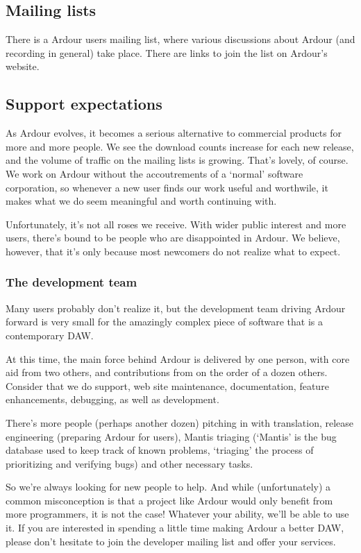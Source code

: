 \documentclass[10pt,a4paper]{book}
\begin{document}
\subsection{Mailing lists}

There is a Ardour users mailing list, where various discussions about
Ardour (and recording in general) take place.  There are links to join
the list on Ardour's website.


\subsection{Support expectations}

As Ardour evolves, it becomes a serious alternative to commercial
products for more and more people. We see the download counts increase
for each new release, and the volume of traffic on the mailing lists
is growing. That's lovely, of course. We work on Ardour without the
accoutrements of a `normal' software corporation, so whenever a new
user finds our work useful and worthwile, it makes what we do seem
meaningful and worth continuing with.

Unfortunately, it's not all roses we receive.  With wider public
interest and more users, there's bound to be people who are
disappointed in Ardour. We believe, however, that it's only because
most newcomers do not realize what to expect.


\subsubsection{The development team}

Many users probably don't realize it, but the development team driving
Ardour forward is very small for the amazingly complex piece of
software that is a contemporary DAW\@.

At this time, the main force behind Ardour is delivered by one person,
with core aid from two others, and contributions from on the order of
a dozen others. Consider that we do support, web site maintenance,
documentation, feature enhancements, debugging, as well as
development.

There's more people (perhaps another dozen) pitching in with
translation, release engineering (preparing Ardour for users), Mantis
triaging (`Mantis' is the bug database used to keep track of known
problems, `triaging' the process of prioritizing and verifying bugs)
and other necessary tasks.

So we're always looking for new people to help. And while
(unfortunately) a common misconception is that a project like Ardour
would only benefit from more programmers, it is not the case! Whatever
your ability, we'll be able to use it. If you are interested in
spending a little time making Ardour a better DAW, please don't
hesitate to join the developer mailing list and offer your services.
\end{document}
